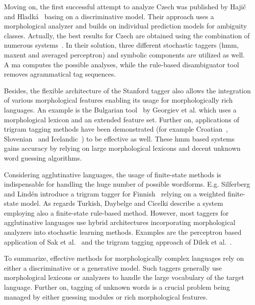 Moving on, the first successful attempt to analyze Czech was published by Hajič and Hladká~\cite{Hajic1998a} basing on a discriminative model.
Their approach uses a morphological analyzer and builds on individual prediction models for ambiguity classes.
Actually, the best results for Czech are obtained using the combination of numerous systems~\cite{Hajic2007}.
In their solution, three different stochastic taggers (\acrshort{hmm}, \acrlong{maxent} and averaged perceptron) and symbolic components are utilized as well.
A \acrshort{ma} computes the possible analyses, while the rule-based disambiguator tool removes agrammatical tag sequences. 

Besides, the flexible architecture of the Stanford tagger \cite{Toutanova2003} also allows the integration of various morphological features enabling its usage for morphologically rich languages.
An example is the Bulgarian tool~\cite{Georgiev2012} by Georgiev et al. which uses a morphological lexicon and an extended feature set.
Further on, applications of trigram tagging methods \cite{Brants2000,Halacsy2007} have been demonstrated (for example Croatian~\cite{Agic2013}, Slovenian~\cite{Agic2013} and Icelandic~\cite{Loftsson2007}) to be effective as well.
These \acrlong{hmm} based systems gains accuracy by relying on large morphological lexicons and decent unknown word guessing algorithms.

Considering agglutinative languages, the usage of finite-state methods is indispensable for handling the huge number of possible wordforms.
E.g. Silferberg and Lindén introduce a trigram tagger for Finnish~\cite{Silfverberg2011} relying on a weighted finite-state model.
As regards Turkish, Daybelge and Cicelki describe a system~\cite{Daybelge2007} employing also a finite-state rule-based method.
However, most taggers for agglutinative languages use hybrid architectures incorporating morphological analyzers into stochastic learning methods.
Examples are the perceptron based application of Sak et al.~\cite{Sak2007} and the trigram tagging approach of Dilek et al.~\cite{Hakkani-Tur2002}.

To summarize, effective methods for morphologically complex languages rely on either a discriminative or a generative model.
Such taggers generally use morphological lexicons or analyzers to handle the large vocabulary of the target language.
Further on, tagging of unknown words is a crucial problem being managed by either guessing modules or rich morphological features. 

